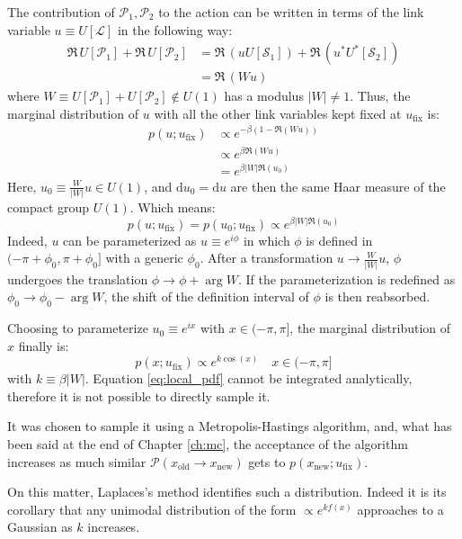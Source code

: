 The contribution of $\mathcal P_1, \mathcal P_2$ to the action can be written in terms of
the link variable $u \equiv U[\mathcal L]$ in the following way:
\[\begin{aligned}
    \Re\,U[\mathcal P_1] + \Re\,U[\mathcal P_2] &= \Re\,(uU[\mathcal S_1]) + \Re\,(u^*U^*[\mathcal S_2]) \\
                                                &= \Re\,(Wu)
\end{aligned}\]
where $W \equiv U[\mathcal P_1] + U[\mathcal P_2] \notin U(1)$ has a modulus $|W|\neq1$.
Thus, the marginal distribution of $u$ with all the other link variables kept fixed at $u_\mathrm{fix}$ is:
\[\begin{aligned}
    p(u;u_\mathrm{fix}) &\propto e^{-\beta(1-\Re(Wu))} \\
                        &\propto e^{\beta\Re(Wu)} \\
                        &= e^{\beta|W|\Re\left(u_0\right)}
\end{aligned}\]
Here, $u_0 \equiv \frac{W}{|W|}u \in U(1)$, and $\mathrm du_0=\mathrm du$ are then the same Haar measure of the compact group $U(1)$.
Which means:
\[
    p(u;u_\mathrm{fix}) = p(u_0;u_\mathrm{fix}) \propto e^{\beta|W|\Re\left(u_0\right)}
\]
Indeed, $u$ can be parameterized as $u\equiv e^{i\phi}$ in which $\phi$ is defined in $(-\pi + \phi_0, \pi + \phi_0]$ with a generic $\phi_0$.
After a transformation $u \rightarrow \frac{W}{|W|}u$, $\phi$ undergoes the translation $\phi \rightarrow \phi + \arg W$.
If the parameterization is redefined as $\phi_0 \rightarrow \phi_0 - \arg W$, the shift of the definition interval of $\phi$ is then reabsorbed.

Choosing to parameterize $u_0 \equiv e^{ix}$ with $x \in (-\pi, \pi]$,
the marginal distribution of $x$ finally is:
\begin{equation}\label{eq:local_pdf}
    p(x;u_\mathrm{fix}) \propto e^{k\cos(x)} \quad x \in (-\pi, \pi]
\end{equation}
with $k \equiv \beta|W|$.
Equation \eqref{eq:local_pdf} cannot be integrated analytically,
therefore it is not possible to directly sample it.

It was chosen to sample it using a Metropolis-Hastings algorithm,
and, what has been said at the end of Chapter \ref{ch:mc},
the acceptance of the algorithm increases as much similar $\mathcal P(x_\mathrm{old}\to x_\mathrm{new})$ gets to $p(x_\mathrm{new};u_\mathrm{fix})$.

On this matter, Laplaces's method identifies such a distribution.
Indeed it is its corollary that any unimodal distribution of the form $\propto e^{kf(x)}$ approaches to a Gaussian as $k$ increases.

